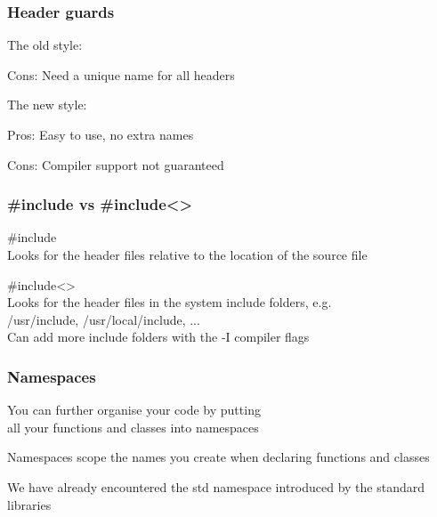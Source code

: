 \documentclass[14pt,a4paper,dvipsnames,usenames]{beamer}
\begin{document}
\begin{frame}[fragile]
  \frametitle{Header guards}

  The old style:

  \vspace{.5em}
  {\color{Marty}Cons:} Need a unique name for all headers

  \vspace{1em}
  The new style:

  \vspace{.5em}
  {\color{FeebleWeek}Pros:} Easy to use, no extra names

  \vspace{.5em}
  {\color{Marty}Cons:} Compiler support not guaranteed\\



\end{frame}

\begin{frame}[fragile]
  \frametitle{{\color{Marty}\#include\raisebox{-1pt}{""}} \;vs\; {\color{Marty}\#include<>}}

  {\color{Marty}\#include\raisebox{-1pt}{""}}\\[.1cm]
  {
    Looks for the header files relative to the location of the source file
  }

  \vspace{1cm}
  {\color{Marty}\#include<>}\\[.1cm]
  {
    Looks for the header files in the system include folders, e.g.\\
    {\color{Tropiteal}/usr/include}, {\color{Tropiteal}/usr/local/include}, ...\\[.1cm]
    Can add more include folders with the {\color{Tropiteal}-I} compiler flags
  }

\end{frame}

\begin{frame}[fragile]
  \frametitle{Namespaces}

  You can further organise your code by putting\\all your functions and classes into namespaces

  \vspace{1em}
  Namespaces {\color{FeebleWeek}scope} the names you create when declaring functions and classes

  \vspace{1em}
  We have already encountered the {\color{Tropiteal}std namespace} introduced by the standard libraries
  
\end{frame}
\end{document}

